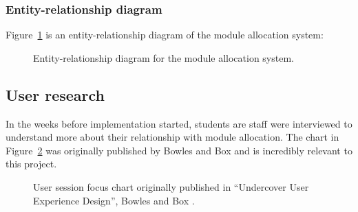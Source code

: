 \documentclass[]{scrartcl}
\begin{document}
\subsubsection{Entity-relationship diagram}


Figure~\ref{er_diagram} is an entity-relationship diagram of the module
allocation system:

\begin{figure}
  \caption{Entity-relationship diagram for the module allocation system.}
  \label{er_diagram}
\end{figure}

\subsection{User research}

In the weeks before implementation started, students are staff were
interviewed to understand more about their relationship with module
allocation. The chart in Figure~\ref{bowles_dualpurpose_chart} was originally
published by Bowles and Box and is incredibly relevant to this project.

\begin{figure}
  \begin{center}
  \end{center}
  \caption{User session focus chart originally published in
    ``Undercover User Experience Design'', Bowles and Box \cite{bowles2011undercover}.}
  \label{bowles_dualpurpose_chart}
\end{figure}
\end{document}

